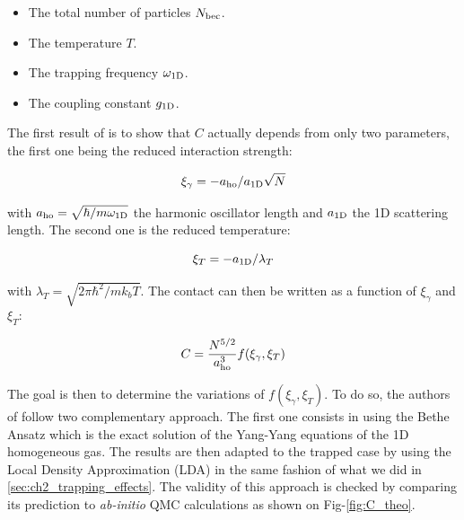 \begin{itemize}
    \item The total number of particles $N_{\rm{bec}}$.
    \item The temperature $T$.
    \item The trapping frequency $\omega_{\rm{1D}}$.
    \item The coupling constant $g_{\rm{1D}}$.
\end{itemize}

\noindent The first result of \cite{yao2018tan} is to show that $C$ actually depends from only two parameters, the first one being the reduced interaction strength:

\begin{equation}
    \xi_{\gamma}=-a_{\rm{ho}}/a_{\rm{1D}}\sqrt{N}
    \label{eq:xi_gamma}
\end{equation}

\noindent with $a_{\rm{ho}}=\sqrt{\hbar/m \omega_{\rm{1D}}}$ the harmonic oscillator length and $a_{\rm{1D}}$ the 1D scattering length. The second one is the reduced temperature:

\begin{equation}
    \xi_T=-a_{\rm{1D}}/\lambda_T
\end{equation}

\noindent with $\lambda_T=\sqrt{2\pi \hbar^2/m k_b T}$. The contact can then be written as a function of $\xi_{\gamma}$ and $\xi_{T}$:

\begin{equation}
    C= \frac{N^{5/2}}{a_{\rm{ho}}^3} f(\xi_{\gamma},\xi_{T})
\end{equation}

The goal is then to determine the variations of $f(\xi_{\gamma},\xi_{T})$. To do so, the authors of \cite{yao2018tan} follow two complementary approach. The first one consists in using the Bethe Ansatz which is the exact solution of the Yang-Yang equations \cite{yang1969thermodynamics} of the 1D homogeneous gas. The results are then adapted to the trapped case by using the Local Density Approximation (LDA) in the same fashion of what we did in \ref{sec:ch2_trapping_effects}. The validity of this approach is checked by comparing its prediction to {\it ab-initio} QMC calculations as shown on Fig-\ref{fig:C_theo}.


